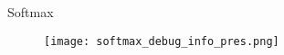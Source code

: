 
\begin{frame}{Softmax}
\begin{figure}
\centering
\texttt{[image: softmax\_debug\_info\_pres.png]}
\end{figure}
\end{frame}
